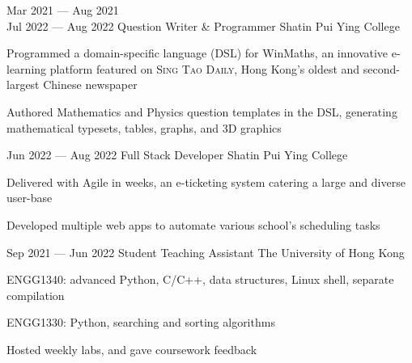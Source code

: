 \cvEntry
{Mar 2021 --- Aug 2021\\Jul 2022 --- Aug 2022 }
{Question Writer \& Programmer}
{Shatin Pui Ying College}
{
\begin{descitemize}
    \specialitem Programmed a domain-specific language (DSL) for WinMaths, an innovative e-learning platform featured on {\scshape Sing Tao Daily}, Hong Kong's oldest and second-largest Chinese newspaper
    \item Authored Mathematics and Physics question templates in the DSL, generating mathematical typesets, tables, graphs, and 3D graphics
\end{descitemize}
}

\cvEntry
{Jun 2022 --- Aug 2022}
{Full Stack Developer}
{Shatin Pui Ying College}
{
\begin{descitemize}
    \item Delivered with Agile in weeks, an e-ticketing system catering a large and diverse user-base
    \item Developed multiple web apps to automate various school's scheduling tasks
\end{descitemize}
}

\cvEntry
{Sep 2021 --- Jun 2022}
{Student Teaching Assistant}
{The University of Hong Kong}
{
\begin{descitemize}
    \item ENGG1340: advanced Python, C/C++, data structures, Linux shell, separate compilation
    \item ENGG1330: Python, searching and sorting algorithms
    \item Hosted weekly labs, and gave coursework feedback
\end{descitemize}
}